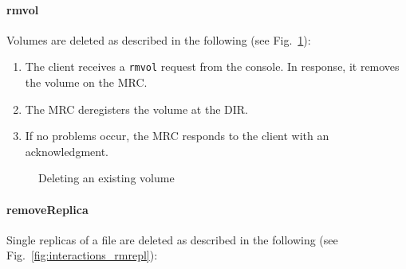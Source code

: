 \paragraph{rmvol}

Volumes are deleted as described in the following (see Fig.\ \ref{fig:interactions_rmvol}):

\begin{enumerate}
 \item The client receives a \texttt{rmvol} request from the console. In response, it removes the volume on the MRC.
 \item The MRC deregisters the volume at the DIR.
 \item If no problems occur, the MRC responds to the client with an acknowledgment.
\end{enumerate}

\begin{figure}[h!]
\centering
{}
\caption{Deleting an existing volume}
\label{fig:interactions_rmvol}
\end{figure}

\paragraph{removeReplica}

Single replicas of a file are deleted as described in the following (see Fig.\ \ref{fig:interactions_rmrepl}):

